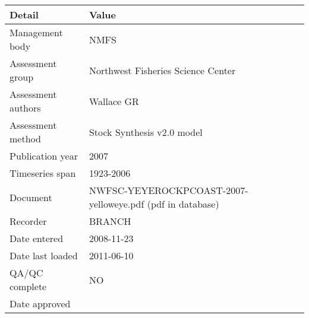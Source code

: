 \begin{table}[htb]
\centering
\begin{tabular}{lp{7cm}}
\toprule
Detail & Value \\
\midrule
Management body    & NMFS                                                      \\
Assessment group   & Northwest Fisheries Science Center                        \\
Assessment authors & Wallace GR                                                \\
Assessment method  & Stock Synthesis v2.0 model                                \\
Publication year   & 2007                                                      \\
Timeseries span    & 1923-2006                                                 \\
Document           & NWFSC-YEYEROCKPCOAST-2007-yelloweye.pdf (pdf in database) \\
Recorder           & BRANCH                                                    \\
Date entered       & 2008-11-23                                                \\
Date last loaded   & 2011-06-10                                                \\
QA/QC complete     & NO                                                        \\
Date approved      &                                                           \\
\bottomrule
\end{tabular}
\label{tab:assessdet}
\end{table}
